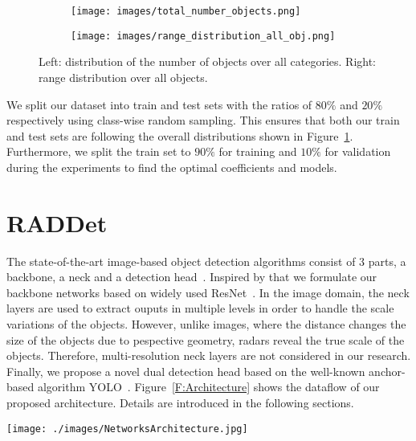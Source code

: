 \documentclass[10pt, conference, compsocconf]{IEEEtran}
\begin{document}
\begin{figure}[h]
	\centering
	\begin{subfigure}{0.25\textwidth}
		\centering
		\texttt{[image: images/total\_number\_objects.png]}
	\end{subfigure}%
	\begin{subfigure}{0.25\textwidth}
		\centering
		\texttt{[image: images/range\_distribution\_all\_obj.png]}
	\end{subfigure}
	\caption{Left: distribution of the number of objects over all categories. Right: range distribution over all objects.}
	\label{F:DatasetAnalysis}
\end{figure}

We split our dataset into train and test sets with the ratios of $80\%$ and $20\%$ respectively using class-wise random sampling. This ensures that both our train and test sets are following the overall distributions shown in Figure~\ref{F:DatasetAnalysis}. Furthermore, we split the train set to $90\%$ for training and $10\%$ for validation during the experiments to find the optimal coefficients and models.

\section{RADDet}

The state-of-the-art image-based object detection algorithms consist of $3$ parts, a backbone, a neck and a detection head~\cite{Ref:YOLOv4, Ref:FCOS, Ref:FocalLoss}. Inspired by that we formulate our backbone networks based on widely used ResNet~\cite{BG:ResNet}. In the image domain, the neck layers are used to extract ouputs in multiple levels in order to handle the scale variations of the objects. However, unlike images, where the distance changes the size of the objects due to pespective geometry, radars reveal the true scale of the objects. Therefore, multi-resolution neck layers are not considered in our research. Finally, we propose a novel dual detection head based on the well-known anchor-based algorithm YOLO~\cite{Ref:YOLOv4}. Figure~\ref{F:Architecture} shows the dataflow of our proposed architecture. Details are introduced in the following sections.

\begin{figure*}[!t]
	\centering
	\texttt{[image: ./images/NetworksArchitecture.jpg]}
	\caption{Dataflow of our proposed networks architecture.}
	\label{F:Architecture}
\end{figure*}
\end{document}
